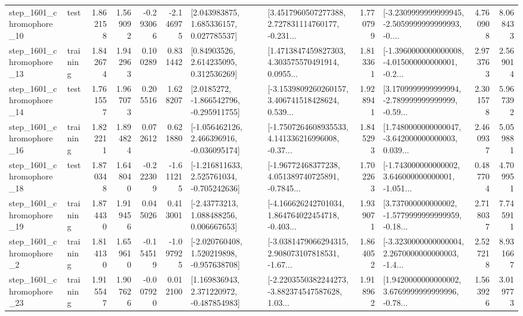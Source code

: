 \begin{tabular}{llrrrrllrlrr}
 step\_1601\_chromophore\_10 &      test &      1.862158 &    1.569092 &     -0.293066 & -2.146975 &     [2.043983875, 1.685336157, 0.027785537] &  [3.4517960507277388, 2.727831114760177, -0.231... &       1.770799 &  [-3.2309999999999945, -2.5059999999999993, -0.... &            4.760908 &          8.068433 \\
 step\_1601\_chromophore\_13 &  training &      1.842674 &    1.942963 &      0.100289 &  0.831442 &      [0.84903526, 2.614235095, 0.312536269] &  [1.4713847459827303, 4.303575570491914, 0.0955... &       1.813361 &  [-1.3960000000000008, -4.015000000000001, -0.2... &            2.973763 &          2.569014 \\
 step\_1601\_chromophore\_14 &      test &      1.761557 &    1.967073 &      0.205516 &  1.628207 &     [2.0185272, -1.866542796, -0.295911755] &  [-3.1539809260260157, 3.406741518428624, 0.539... &       1.928941 &  [3.1709999999999994, -2.789999999999999, -0.59... &            2.301578 &          5.967392 \\
 step\_1601\_chromophore\_16 &  training &      1.822211 &    1.894824 &      0.072612 &  0.621880 &   [-1.056462126, 2.466396916, -0.036095174] &  [-1.7507264608935533, 4.141336216996008, -0.37... &       1.845293 &  [1.7480000000000047, -3.642000000000003, 0.039... &            2.460937 &          5.059881 \\
 step\_1601\_chromophore\_18 &      test &      1.870348 &    1.648040 &     -0.222309 & -1.611215 &   [-1.216811633, 2.525761034, -0.705242636] &  [-1.96772468377238, 4.051389740725891, -0.7845... &       1.702263 &  [-1.743000000000002, 3.646000000000001, -1.051... &            0.487704 &          4.709951 \\
 step\_1601\_chromophore\_19 &  training &      1.874430 &    1.919456 &      0.045026 &  0.413001 &     [-2.43773213, 1.088488256, 0.006667653] &  [-4.166626242701034, 1.864764022454718, -0.403... &       1.939071 &  [3.737000000000002, -1.5779999999999959, -0.18... &            2.718037 &          7.745911 \\
  step\_1601\_chromophore\_2 &  training &      1.814130 &    1.659610 &     -0.154519 & -1.097925 &   [-2.020760408, 1.520219898, -0.957638708] &  [-3.0381479066294315, 2.908073107818531, -1.67... &       1.864052 &  [-3.3230000000000004, 2.2670000000000003, -1.4... &            2.527218 &          8.931667 \\
 step\_1601\_chromophore\_23 &  training &      1.915547 &    1.907626 &     -0.007920 &  0.012100 &    [1.169836943, 2.371220972, -0.487854983] &  [-2.2203550382244273, -3.882374547587628, 1.03... &       1.918962 &  [1.9420000000000002, 3.6769999999999996, -0.78... &            1.563926 &          3.019773 \\

\end{tabular}
